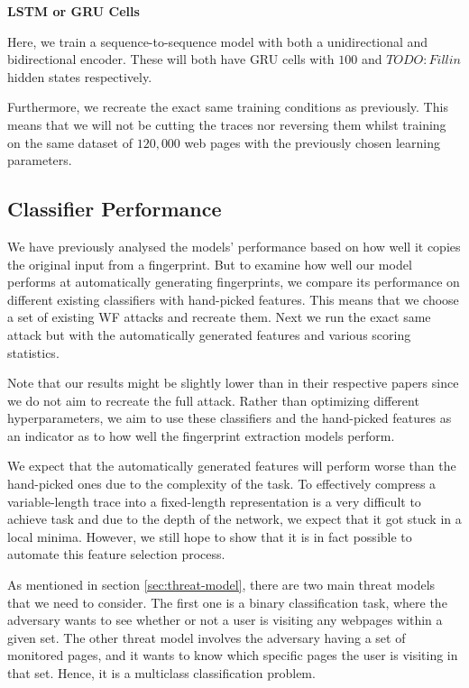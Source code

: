
\noindent
\textbf{LSTM or GRU Cells}

Here, we train a sequence-to-sequence model with both a unidirectional and bidirectional encoder.
These will both have GRU cells with $100$ and $TODO: Fill in$ hidden states respectively.

Furthermore, we recreate the exact same training conditions as previously.
This means that we will not be cutting the traces nor reversing them whilst training on the same dataset of $120,000$ web pages with the previously chosen learning parameters.


\subsection{Classifier Performance}

We have previously analysed the models' performance based on how well it copies the original input from a fingerprint.
But to examine how well our model performs at automatically generating fingerprints, we compare its performance on different existing classifiers with hand-picked features.
This means that we choose a set of existing WF attacks and recreate them.
Next we run the exact same attack but with the automatically generated features and various scoring statistics.

Note that our results might be slightly lower than in their respective papers since we do not aim to recreate the full attack.
Rather than optimizing different hyperparameters, we aim to use these classifiers and the hand-picked features as an indicator as to how well the fingerprint extraction models perform.

We expect that the automatically generated features will perform worse than the hand-picked ones due to the complexity of the task.
To effectively compress a variable-length trace into a fixed-length representation is a very difficult to achieve task and due to the depth of the network, we expect that it got stuck in a local minima.
However, we still hope to show that it is in fact possible to automate this feature selection process.

As mentioned in section \ref{sec:threat-model}, there are two main threat models that we need to consider.
The first one is a binary classification task, where the adversary wants to see whether or not a user is visiting any webpages within a given set.
The other threat model involves the adversary having a set of monitored pages, and it wants to know which specific pages the user is visiting in that set.
Hence, it is a multiclass classification problem.

